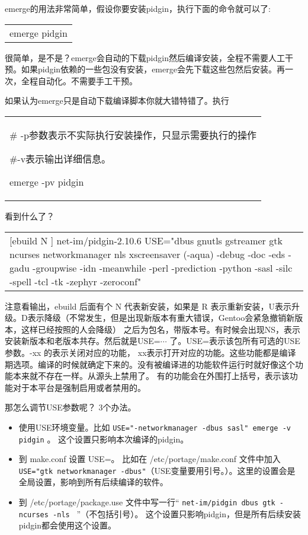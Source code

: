 \documentclass[amstex,twoside]{ctexbook}
\newenvironment{code}{\small\tt\begin{longtable}{p{0.8\textwidth}}}{\end{longtable}}
\begin{document}
emerge的用法非常简单，假设你要安装pidgin，执行下面的命令就可以了:
\begin{code}
emerge pidgin
\end{code}

很简单，是不是？emerge会自动的下载pidgin然后编译安装，全程不需要人工干预。如果pidgin依赖的一些包没有安装，emerge会先下载这些包然后安装。再一次，全程自动化。不需要手工干预。

如果认为emerge只是自动下载编译脚本你就大错特错了。执行
\begin{code}
\# -p参数表示不实际执行安装操作，只显示需要执行的操作

\#-v表示输出详细信息。

emerge -pv pidgin
\end{code}

看到什么了？

\begin{code}
[ebuild   N    ] net-im/pidgin-2.10.6 USE="dbus gnutls gstreamer gtk ncurses networkmanager nls xscreensaver (-aqua) -debug -doc -eds -gadu -groupwise -idn -meanwhile -perl -prediction -python -sasl -silc -spell -tcl -tk -zephyr -zeroconf"
\end{code}

注意看输出，ebuild 后面有个 N 代表新安装，如果是 R 表示重新安装，U表示升级。D表示降级（不常发生，但是出现新版本有重大错误，Gentoo会紧急撤销新版本，这样已经按照的人会降级）
之后为包名，带版本号。有时候会出现NS，表示安装新版本和老版本共存。然后就是USE=$\cdots$ 了。USE=表示该包所有可选的USE参数。-xx 的表示关闭对应的功能， xx表示打开对应的功能。这些功能都是编译期选项。编译的时候就确定下来的。没有被编译进的功能软件运行时就好像这个功能本来就不存在一样。从源头上禁用了。
有的功能会在外围打上括号，表示该功能对于本平台是强制启用或者禁用的。

那怎么调节USE参数呢？ 3个办法。

\begin{itemize}
\item 使用USE环境变量。比如{ \tt  USE="-networkmanager -dbus sasl" emerge -v pidgin} 。 这个设置只影响本次编译的pidgin。
\item 到 make.conf 设置 USE=。 比如在 /etc/portage/make.conf 文件中加入 {\tt USE="gtk networkmanager -dbus"}（USE变量要用引号。）。这里的设置会是全局设置，影响到所有后续编译的软件。
\item 到 /etc/portage/package.use 文件中写一行“ { \tt  net-im/pidgin dbus gtk -ncurses -nls } ”（不包括引号）。 这个设置只影响pidgin，但是所有后续安装pidgin都会使用这个设置。
\end{itemize}
\end{document}
